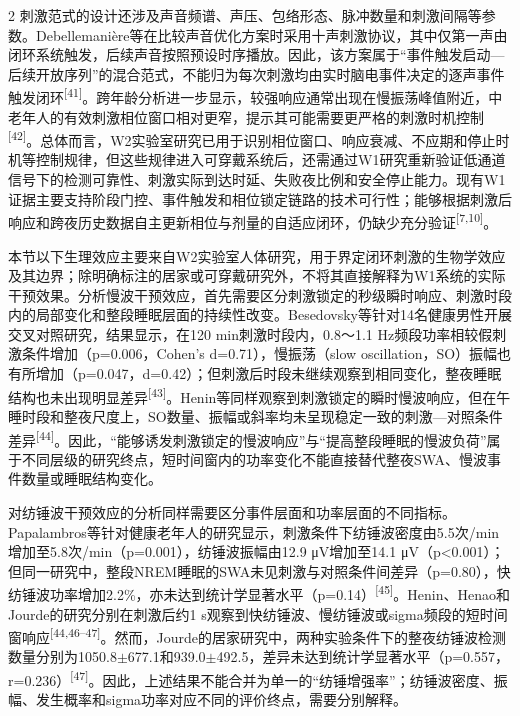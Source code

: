 \documentclass[UTF8,zihao=5,fontset=none]{ctexart}
\newcommand{\hei}{\CJKfamily{hei}}
\newcommand{\leveltwo}[1]{%
  \par\noindent{\hei\fontsize{10.5pt}{15.6pt}\selectfont\bfseries #1\par}}
\newcommand{\refcite}[1]{\nolinebreak[4]\textsuperscript{[#1]}}
\begin{document}
\begin{multicols}{2}
刺激范式的设计还涉及声音频谱、声压、包络形态、脉冲数量和刺激间隔等参数。Debellemanière等在比较声音优化方案时采用十声刺激协议，其中仅第一声由闭环系统触发，后续声音按照预设时序播放。因此，该方案属于“事件触发启动—后续开放序列”的混合范式，不能归为每次刺激均由实时脑电事件决定的逐声事件触发闭环\refcite{41}。跨年龄分析进一步显示，较强响应通常出现在慢振荡峰值附近，中老年人的有效刺激相位窗口相对更窄，提示其可能需要更严格的刺激时机控制\refcite{42}。总体而言，W2实验室研究已用于识别相位窗口、响应衰减、不应期和停止时机等控制规律，但这些规律进入可穿戴系统后，还需通过W1研究重新验证低通道信号下的检测可靠性、刺激实际到达时延、失败夜比例和安全停止能力。现有W1证据主要支持阶段门控、事件触发和相位锁定链路的技术可行性；能够根据刺激后响应和跨夜历史数据自主更新相位与剂量的自适应闭环，仍缺少充分验证\refcite{7,10}。\par

\leveltwo{3.2 慢波与纺锤活动调制及其耦合的生理证据}

本节以下生理效应主要来自W2实验室人体研究，用于界定闭环刺激的生物学效应及其边界；除明确标注的居家或可穿戴研究外，不将其直接解释为W1系统的实际干预效果。分析慢波干预效应，首先需要区分刺激锁定的秒级瞬时响应、刺激时段内的局部变化和整段睡眠层面的持续性改变。Besedovsky等针对14名健康男性开展交叉对照研究，结果显示，在120 min刺激时段内，0.8～1.1 Hz频段功率相较假刺激条件增加（p=0.006，Cohen's d=0.71），慢振荡（slow oscillation，SO）振幅也有所增加（p=0.047，d=0.42）；但刺激后时段未继续观察到相同变化，整夜睡眠结构也未出现明显差异\refcite{43}。Henin等同样观察到刺激锁定的瞬时慢波响应，但在午睡时段和整夜尺度上，SO数量、振幅或斜率均未呈现稳定一致的刺激—对照条件差异\refcite{44}。因此，“能够诱发刺激锁定的慢波响应”与“提高整段睡眠的慢波负荷”属于不同层级的研究终点，短时间窗内的功率变化不能直接替代整夜SWA、慢波事件数量或睡眠结构变化。\par

对纺锤波干预效应的分析同样需要区分事件层面和功率层面的不同指标。Papalambros等针对健康老年人的研究显示，刺激条件下纺锤波密度由5.5次/min增加至5.8次/min（p=0.001），纺锤波振幅由12.9 μV增加至14.1 μV（p<0.001）；但同一研究中，整段NREM睡眠的SWA未见刺激与对照条件间差异（p=0.80），快纺锤波功率增加2.2\%，亦未达到统计学显著水平（p=0.14）\refcite{45}。Henin、Henao和Jourde的研究分别在刺激后约1 s观察到快纺锤波、慢纺锤波或sigma频段的短时间窗响应\refcite{44,46--47}。然而，Jourde的居家研究中，两种实验条件下的整夜纺锤波检测数量分别为1050.8$\pm$677.1和939.0$\pm$492.5，差异未达到统计学显著水平（p=0.557，r=0.236）\refcite{47}。因此，上述结果不能合并为单一的“纺锤增强率”；纺锤波密度、振幅、发生概率和sigma功率对应不同的评价终点，需要分别解释。\par


\end{multicols}
\end{document}
